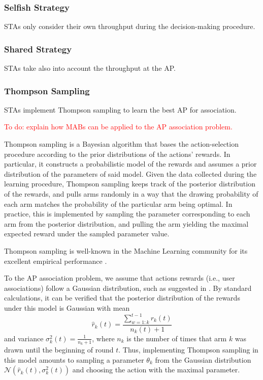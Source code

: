 \documentclass{article}
\begin{document}
		\subsubsection{Selfish Strategy}
		\label{section:selfish}
			STAs only consider their own throughput during the decision-making procedure.
			
		\subsubsection{Shared Strategy}
		\label{section:shared}
			STAs take also into account the throughput at the AP.
	
		\subsubsection{Thompson Sampling}
		\label{section:thompson}
			STAs implement Thompson sampling to learn the best AP for association. 
			
			\textcolor{red}{To do: explain how MABs can be applied to the AP association problem.}	
			
			Thompson sampling \cite{thompson1933likelihood} is a Bayesian algorithm that bases the action-selection procedure according to the prior distributions of the actions' rewards. In particular, it constructs a probabilistic model of the rewards and assumes a prior distribution of the parameters of said model. Given the data collected during the learning procedure, Thompson sampling keeps track of the posterior distribution of the rewards, and pulls arms randomly in a way that the drawing probability of each arm matches the probability of the particular arm being optimal. In practice, this is implemented by sampling the parameter corresponding to each arm from the posterior distribution, and pulling the arm yielding the maximal expected reward under the sampled parameter value.
					
			Thompson sampling is well-known in the Machine Learning community for its excellent empirical performance \cite{CL11}. 
			 
			To the AP association problem, we assume that actions rewards (i.e., user associations) follow a Gaussian distribution, such as suggested in \cite{agrawal2013further}. By standard calculations, it can be verified that the posterior distribution of the rewards under this model is Gaussian with mean 
			\begin{equation}
				\hat{r}_k(t) = \frac{\sum_{w=1:k}^{t-1} r_k(t) }{n_k(t) + 1}
				\nonumber
			\end{equation}
			and variance $\sigma_k^2(t) = \frac{1}{n_k + 1}$, where $n_k$ is the number of times that arm $k$ was drawn until the beginning of round $t$. Thus, implementing Thompson sampling in this model amounts to sampling a parameter $\theta_k$ from the Gaussian distribution $\mathcal{N}\left(\hat{r}_k(t),\sigma_k^2(t)\right)$ and choosing the action with the maximal parameter.   
			
\end{document}
